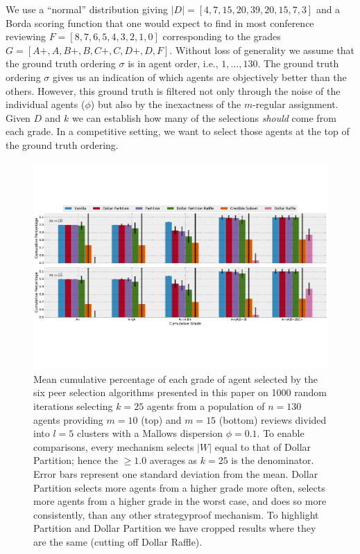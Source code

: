 \documentclass[letterpaper]{article}
\begin{document}
We use a ``normal'' distribution %
giving $|D| = [4, 7, 15, 20, 39, 20, 15, 7, 3]$
and a Borda scoring function that one would expect to find in most conference reviewing
$F = [8, 7, 6, 5, 4, 3, 2, 1, 0]$ corresponding to the grades $G = [A+, A, B+, B, C+, C, D+, D, F]$. Without loss of generality we assume that the ground truth ordering $\sigma$ is in agent order, i.e., $1, \ldots, 130$. 
The ground truth ordering $\sigma$ gives us an indication of which agents are objectively better
than the others. However, this ground truth is filtered not only through the noise of the individual
agents ($\phi$) but also by the inexactness of the $m$-regular assignment. Given $D$ and $k$ we can 
establish how many of the selections \emph{should} come from each grade.
In a competitive setting, we want to select those agents at the top of the ground truth ordering.

\begin{figure}[!ht]
\centering
\includegraphics[width=.8\textwidth]{./cumulative_grade_big-emb}
\caption{Mean cumulative percentage of each grade of agent selected by the six peer selection algorithms presented in this paper on 1000 random iterations selecting $k=25$ agents from a population of $n=130$ agents providing $m=10$ (top) and $m=15$ (bottom) reviews divided into $l=5$ clusters with a Mallows dispersion $\phi = 0.1$. To enable comparisons, every mechanism selects $|W|$ equal to that of Dollar Partition; hence the $\geq 1.0$ averages as $k=25$ is the denominator. 
Error bars represent one standard deviation from the mean. 
Dollar Partition selects more agents from a higher grade more often, selects more agents from a higher grade in the worst case, and does so more consistently, than any other strategyproof mechanism. To highlight Partition and Dollar Partition we have cropped results where they are the same (cutting off Dollar Raffle).}\label{fig:results}
\end{figure}
\end{document}
